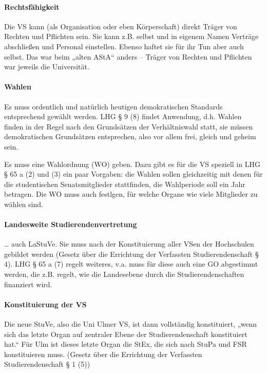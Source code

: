 \documentclass[
10pt,
a4paper,
twoside,								%
titlepage=false,							%
draft=false								%
]{scrartcl}
\begin{document}
\paragraph{Rechtsfähigkeit}

Die VS kann (als Organisation oder eben Körperschaft) direkt Träger von Rechten und Pflichten sein. Sie kann z.B. selbst und in eigenem Namen Verträge abschließen und Personal einstellen. Ebenso haftet sie für ihr Tun aber auch selbst. Das war beim „alten AStA“ anders – Träger von Rechten und Pflichten war jeweils die Universität.



\paragraph{Wahlen}

Es muss ordentlich und natürlich heutigen demokratischen Standards entsprechend gewählt werden. LHG § 9 (8) findet Anwendung, d.h. Wahlen finden in der Regel nach den Grundsätzen der Verhältniswahl statt, sie müssen demokratischen Grundsätzen entsprechen, also vor allem frei, gleich und geheim sein.

Es muss eine Wahlordnung (WO) geben. Dazu gibt es für die VS speziell in LHG § 65 a (2) und (3) ein paar Vorgaben: die Wahlen sollen gleichzeitig mit denen für die studentischen Senatsmitglieder stattfinden, die Wahlperiode soll ein Jahr betragen. Die WO muss auch festlgen, für welche Organe wie viele Mitglieder zu wählen sind.



\paragraph{Landesweite Studierendenvertretung}

… auch LaStuVe. Sie muss nach der Konstituierung aller VSen der Hochschulen gebildet werden (Gesetz über die Errichtung der Verfassten Studierendenschaft § 4). LHG § 65 a (7) regelt weiteres, v.a. muss für diese auch eine GO abgestimmt werden, die z.B. regelt, wie die Landesebene durch die Studierendenschaften finanziert wird.


\paragraph{Konstituierung der VS}

Die neue StuVe, also die Uni Ulmer VS, ist dann vollständig konstituiert, „wenn sich das letzte Organ auf zentraler Ebene der Studierendenschaft konstituiert hat.“ Für Ulm ist dieses letzte Organ die StEx, die sich nach StuPa und FSR konstituieren muss. (Gesetz über die Errichtung der Verfassten Studierendenschaft § 1 (5))
\end{document}
